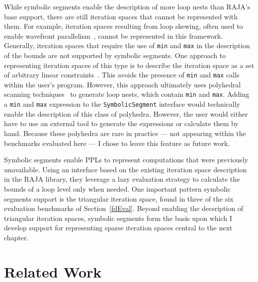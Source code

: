 While symbolic segments enable the description of more loop nests than RAJA's base support, there are still iteration spaces that cannot be represented with them.
For example, iteration spaces resulting from loop skewing, often used to enable wavefront parallelism~\cite{wolf1991loop}, cannot be represented in this framework. 
Generally, iteration spaces that require the use of \verb.min. and \verb.max. in the description of the bounds are not supported by symbolic segments.
One approach to representing iteration spaces of this type is to describe the iteration space as a set of arbitrary linear constraints~\cite{verdoolaege2012polyhedral}.
This avoids the presence of \verb.min. and \verb.max. calls within the user's program.
However, this approach ultimately uses polyhedral scanning techniques~\cite{pouchet2007iterative,grosser2011polly, benabderrahmane2010polyhedral} to generate loop nests, which contain \verb.min. and \verb.max..
Adding a \verb.min. and \verb.max. expression to the \verb.SymbolicSegment. interface would technically enable the description of this class of polyhedra.
However, the user would either have to use an external tool to generate the expressions or calculate them by hand.
Because these polyhedra are rare in practice --- not appearing within the benchmarks evaluated here --- I chose to leave this feature as future work.

Symbolic segments enable PPLs to represent computations that were previously unavailable.
Using an interface based on the existing iteration space description in the RAJA library, they leverage a lazy evaluation strategy to calculate the bounds of a loop level only when needed.
One important pattern symbolic segments support is the triangular iteration space, found in three of the six evaluation benchmarks of Section~\ref{fdEval}.
Beyond enabling the decsription of triangular iteration spaces, symbolic segments form the basis upon which I develop support for representing sparse iteration spaces central to the next chapter.

\section{Related Work}

